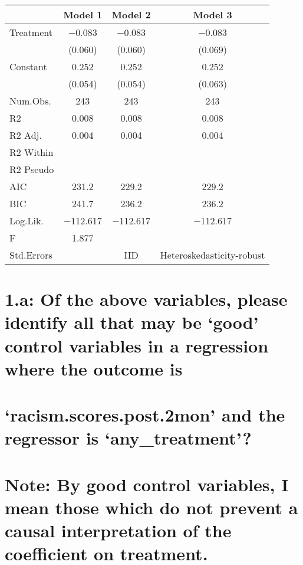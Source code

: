 \documentclass[
]{article}
\begin{document}
\begin{table}
\centering
\begin{tabular}[t]{lccc}
\toprule
  & Model 1 & Model 2 & Model 3\\
\midrule
Treatment & \num{-0.083} & \num{-0.083} & \num{-0.083}\\
 & (\num{0.060}) & (\num{0.060}) & (\num{0.069})\\
Constant & \num{0.252} & \num{0.252} & \num{0.252}\\
 & (\num{0.054}) & (\num{0.054}) & (\num{0.063})\\
\midrule
Num.Obs. & \num{243} & \num{243} & \num{243}\\
R2 & \num{0.008} & \num{0.008} & \num{0.008}\\
R2 Adj. & \num{0.004} & \num{0.004} & \num{0.004}\\
R2 Within &  &  & \\
R2 Pseudo &  &  & \\
AIC & \num{231.2} & \num{229.2} & \num{229.2}\\
BIC & \num{241.7} & \num{236.2} & \num{236.2}\\
Log.Lik. & \num{-112.617} & \num{-112.617} & \num{-112.617}\\
F & \num{1.877} &  & \\
Std.Errors &  & IID & Heteroskedasticity-robust\\
\bottomrule
\end{tabular}
\end{table}

\hypertarget{a-of-the-above-variables-please-identify-all-that-may-be-good-control-variables-in-a-regression-where-the-outcome-is}{%
\section{1.a: Of the above variables, please identify all that may be
`good' control variables in a regression where the outcome
is}\label{a-of-the-above-variables-please-identify-all-that-may-be-good-control-variables-in-a-regression-where-the-outcome-is}}

\hypertarget{racism.scores.post.2mon-and-the-regressor-is-any_treatment}{%
\section{`racism.scores.post.2mon' and the regressor is
`any\_treatment'?}\label{racism.scores.post.2mon-and-the-regressor-is-any_treatment}}

\hypertarget{note-by-good-control-variables-i-mean-those-which-do-not-prevent-a-causal-interpretation-of-the-coefficient-on-treatment.}{%
\section{Note: By good control variables, I mean those which do not
prevent a causal interpretation of the coefficient on
treatment.}\label{note-by-good-control-variables-i-mean-those-which-do-not-prevent-a-causal-interpretation-of-the-coefficient-on-treatment.}}
\end{document}

